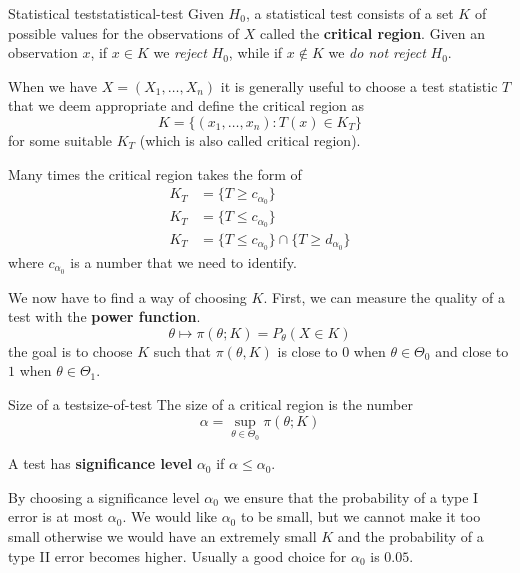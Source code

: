 \documentclass[12pt]{extarticle}
\begin{document}
\begin{definition}{Statistical test}{statistical-test}
	Given $H_0$, a statistical test consists of a set $K$ of possible values for the observations of $X$ called the \textbf{critical region}.
	Given an observation $x$, if $x \in K$ we \emph{reject} $H_0$, while if $x \notin K$ we \emph{do not reject} $H_0$.
\end{definition}

When we have $X = (X_1, \dots, X_n)$ it is generally useful to choose a test statistic $T$ that we deem appropriate and define the critical region as
\begin{equation}
	K = \{ (x_1, \dots, x_n) : T(x) \in K_T \}
\end{equation}
for some suitable $K_T$ (which is also called critical region).

Many times the critical region takes the form of
\begin{align}
	K_T & = \{ T \geq c_{\alpha_0} \}                                \\
	K_T & = \{ T \leq c_{\alpha_0} \}                                \\
	K_T & = \{ T \leq c_{\alpha_0} \} \cap \{ T \geq d_{\alpha_0} \}
\end{align}
where $c_{\alpha_0}$ is a number that we need to identify.

We now have to find a way of choosing $K$.
First, we can measure the quality of a test with the \textbf{power function}.
\begin{equation}
	\theta \mapsto \pi(\theta; K) = P_\theta(X \in K)
\end{equation}
the goal is to choose $K$ such that $\pi(\theta, K)$ is close to $0$ when $\theta \in \Theta_0$ and close to $1$ when $\theta \in \Theta_1$.

\begin{definition}{Size of a test}{size-of-test}
	The size of a critical region is the number
	\begin{equation}
		\alpha = \sup_{\theta \in \Theta_0} \pi(\theta; K)
	\end{equation}

	A test has \textbf{significance level} $\alpha_0$ if $\alpha \leq \alpha_0$.
\end{definition}

By choosing a significance level $\alpha_0$ we ensure that the probability of a type I error is at most $\alpha_0$.
We would like $\alpha_0$ to be small, but we cannot make it too small otherwise we would have an extremely small $K$ and the probability of a type II error becomes higher.
Usually a good choice for $\alpha_0$ is $0.05$.
\end{document}
